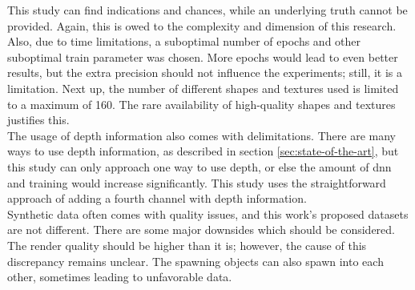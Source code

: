 		\clearpage
		This study can find indications and chances, while an underlying truth cannot be provided. Again, this is owed to the complexity and dimension of this research.\\
		Also, due to time limitations, a suboptimal number of epochs and other suboptimal train parameter was chosen. More epochs would lead to even better results, but the extra precision should not influence the experiments; still, it is a limitation.
		Next up, the number of different shapes and textures used is limited to a maximum of 160. The rare availability of high-quality shapes and textures justifies this.\\
		The usage of depth information also comes with delimitations. There are many ways to use depth information, as described in section \ref{sec:state-of-the-art}, but this study can only approach one way to use depth, or else the amount of \ac{dnn} and training would increase significantly. This study uses the straightforward approach of adding a fourth channel with depth information.\\
		Synthetic data often comes with quality issues, and this work's proposed datasets are not different. There are some major downsides which should be considered. The render quality should be higher than it is; however, the cause of this discrepancy remains unclear. The spawning objects can also spawn into each other, sometimes leading to unfavorable data. 
	
	
	
